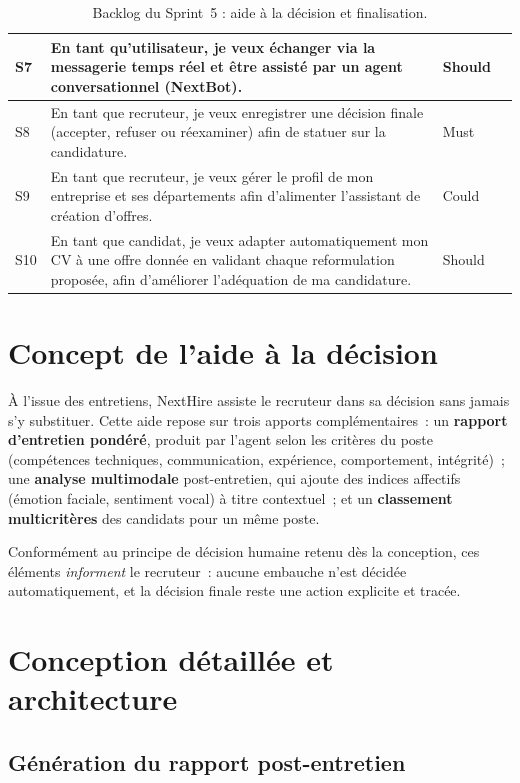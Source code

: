 \begin{table}[H]
\begin{tabularx}{\textwidth}{|>{\centering\arraybackslash}p{1.1cm}|>{\raggedright\arraybackslash}X|>{\centering\arraybackslash}p{1.7cm}|>{\centering\arraybackslash}p{0.9cm}|}
    \hline
    S7 & En tant qu'utilisateur, je veux échanger via la messagerie temps réel et être assisté par un agent conversationnel (NextBot). & Should & 5 \\
    \hline
    S8 & En tant que recruteur, je veux enregistrer une décision finale (accepter, refuser ou réexaminer) afin de statuer sur la candidature. & Must & 3 \\
    \hline
    S9 & En tant que recruteur, je veux gérer le profil de mon entreprise et ses départements afin d'alimenter l'assistant de création d'offres. & Could & 3 \\
    \hline
    S10 & En tant que candidat, je veux adapter automatiquement mon CV à une offre donnée en validant chaque reformulation proposée, afin d'améliorer l'adéquation de ma candidature. & Should & 5 \\
    \hline
  \end{tabularx}
  \caption{Backlog du Sprint~5 : aide à la décision et finalisation.}
  \label{tab:backlog-s5}
\end{table}

\section{Concept de l'aide à la décision}

À l'issue des entretiens, NextHire assiste le recruteur dans sa décision sans jamais s'y substituer. Cette aide repose sur trois apports complémentaires~: un \textbf{rapport d'entretien pondéré}, produit par l'agent selon les critères du poste (compétences techniques, communication, expérience, comportement, intégrité)~; une \textbf{analyse multimodale} post-entretien, qui ajoute des indices affectifs (émotion faciale, sentiment vocal) à titre contextuel~; et un \textbf{classement multicritères} des candidats pour un même poste.

Conformément au principe de décision humaine retenu dès la conception, ces éléments \textit{informent} le recruteur~: aucune embauche n'est décidée automatiquement, et la décision finale reste une action explicite et tracée.

\section{Conception détaillée et architecture}

\subsection{Génération du rapport post-entretien}

